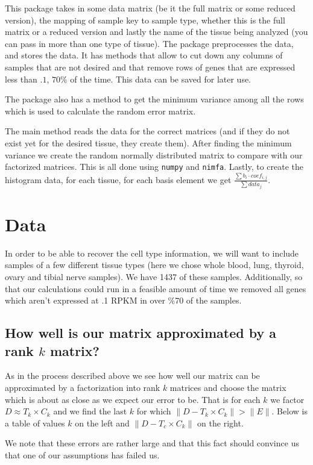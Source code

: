 \documentclass[10pt]{article}
\begin{document}
This package takes in some data matrix (be it the full matrix or some reduced version), the mapping of sample key to sample type, whether this is the full matrix or a reduced version and lastly the name of the tissue being analyzed (you can pass in more than one type of tissue).  The package preprocesses the data, and stores the data.  It has methods that allow to cut down any columns of samples that are not desired and that remove rows of genes that are expressed less than $.1$, $70\%$ of the time.  This data can be saved for later use.

The package also has a method to get the minimum variance among all the rows which is used to calculate the random error matrix.

The main method reads the data for the correct matrices (and if they do not exist yet for the desired tissue, they create them).  After finding the minimum variance we create the random normally distributed matrix to compare with our factorized matrices.  This is all done using \texttt{numpy} and \texttt{nimfa}.
Lastly, to create the histogram data, for each tissue, for each basis element we get $\frac{\sum{b_i} \cdot coef_{i,j}}{\sum data_j}$.

\section{Data}

In order to be able to recover the cell type information, we will want to include samples of a few different tissue types (here we chose whole blood, lung, thyroid, ovary and tibial nerve samples).
We have 1437 of these samples.
Additionally, so that our calculations could run in a feasible amount of time we removed all genes which aren't expressed at .1 RPKM in over \%70 of the samples.

\subsection{How well is our matrix approximated by a rank \(k\) matrix?}
As in the process described above we see how well our matrix can be approximated by a factorization into rank \(k\) matrices and choose the matrix which is about as close as we expect our error to be.
That is for each \(k\) we factor \(D \approx T_k \times C_k\) and we find the last \(k\) for which \(\|D - T_k \times C_k\| > \|E\|\).
Below is a table of values \(k\) on the left and \(\|D - T_c \times C_k\|\) on the right.

We note that these errors are rather large and that this fact should convince us that one of our assumptions has failed us.
\end{document}

